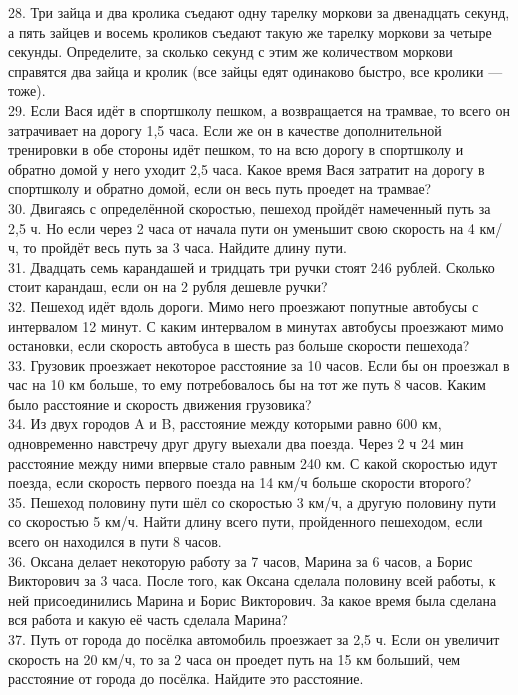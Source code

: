 \documentclass[12pt]{article}
\begin{document}
28. Три зайца и два кролика съедают одну тарелку моркови за двенадцать секунд, а пять зайцев и восемь кроликов съедают такую же тарелку моркови за четыре секунды. Определите, за сколько секунд с этим же количеством моркови справятся два зайца и кролик (все зайцы едят одинаково быстро, все кролики --- тоже).\\
29. Если Вася идёт в спортшколу пешком, а возвращается на трамвае, то всего он затрачивает на дорогу 1,5 часа. Если же он в качестве дополнительной тренировки в обе стороны идёт пешком, то на всю дорогу в спортшколу и обратно домой у него уходит 2,5 часа. Какое время Вася затратит на дорогу в спортшколу и обратно домой, если он весь путь проедет на трамвае?\\
30. Двигаясь с определённой скоростью, пешеход пройдёт намеченный путь за 2,5 ч. Но если через 2 часа от начала пути он уменьшит свою скорость на 4 км/ч, то пройдёт весь путь за 3 часа. Найдите длину пути.\\
31. Двадцать семь карандашей и тридцать три ручки стоят 246 рублей. Сколько стоит карандаш, если он на 2 рубля дешевле ручки?\\
32. Пешеход идёт вдоль дороги. Мимо него проезжают попутные автобусы с интервалом 12 минут. С каким интервалом в минутах автобусы проезжают мимо остановки, если скорость автобуса в шесть раз больше скорости пешехода?\\
33. Грузовик проезжает некоторое расстояние за 10 часов. Если бы он проезжал в час на 10 км больше, то ему потребовалось бы на тот же путь 8 часов. Каким было расстояние и скорость движения грузовика?\\
34. Из двух городов A и B, расстояние между которыми равно 600 км, одновременно навстречу друг другу выехали два поезда. Через 2 ч 24 мин расстояние между ними впервые стало равным 240 км. С какой скоростью идут поезда, если скорость первого поезда на 14 км/ч больше скорости второго?\\
35. Пешеход половину пути шёл со скоростью 3 км/ч, а другую половину пути со скоростью 5 км/ч. Найти длину всего пути, пройденного пешеходом, если всего он находился в пути 8 часов.\\
36. Оксана делает некоторую работу за 7 часов, Марина за 6 часов, а Борис Викторович за 3 часа. После того, как Оксана сделала половину всей работы, к ней присоединились Марина и Борис Викторович. За какое время была сделана вся работа и какую её часть сделала Марина?\\
37. Путь от города до посёлка автомобиль проезжает за 2,5 ч. Если он увеличит скорость на 20 км/ч, то за 2 часа он проедет путь на 15 км больший, чем расстояние от города до посёлка. Найдите это расстояние.\\
\end{document}
